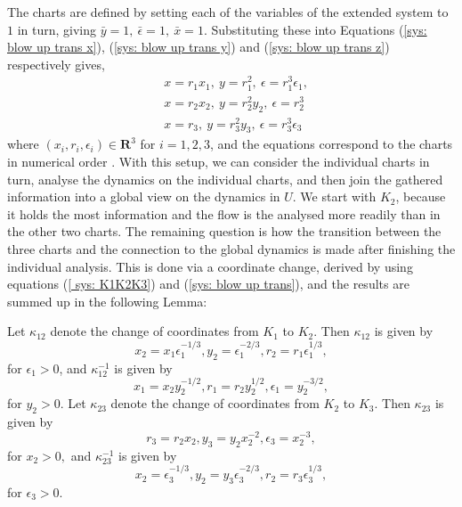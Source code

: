 The charts are defined by setting each of the variables of the extended system to $1$ in turn, giving $ \bar{y}=1, \ \bar{\epsilon}=1, \ \bar{x}=1 $. Substituting these into Equations (\ref{sys: blow up trans x}), (\ref{sys: blow up trans y}) and (\ref{sys: blow up trans z}) respectively gives, 
\begin{subequations} \label{ sys: K1K2K3}
	\begin{align}
	&x=r_1x_1, \ y=r_1^2, \ \epsilon=r_1^3\epsilon_1, \label{sys: K1}\\
	&x=r_2x_2, \ y=r_2^2y_2, \ \epsilon=r_2^3 \label{sys: K2}\\
	&x=r_3, \ y=r_3^2y_3, \ \epsilon=r_3^3\epsilon_3\label{sys:K3}
	\end{align}
\end{subequations}
where $ (x_i,r_i,\epsilon_i)\in\mathbf{R}^3 $ for $ i=1,2,3 $, and the equations correspond to the charts in numerical order \citep{krupa2001}. 
With this setup, we can consider the individual charts in turn, analyse the dynamics on the individual charts, and then join the gathered information into a global view on the dynamics in $U$.
We start with $K_2$,  because it holds the most information and the flow is the analysed more readily than in the other two charts. 
The remaining question is how the transition between the three charts and the connection to the global dynamics is made after finishing the individual analysis.
This is done via a coordinate change, derived by using equations (\ref{ sys: K1K2K3}) and (\ref{sys: blow up trans}), and the results are summed up in the following Lemma:
\begin{lemma} \label{coord. change}
Let $\kappa_{12}$ denote the change of coordinates from $K_1$ to $K_2$. Then $\kappa_{12}$ is given by \\
\begin{equation*}
x_2 = x_1 \epsilon_1^{-1/3},  y_2 = \epsilon_1^{-2/3}, r_2= r_1\epsilon_1^{1/3},
\end{equation*}
for $\epsilon_1 >0$,
and $\kappa_{12}^{-1}$ is given by
\begin{equation*}
x_1 = x_2y_2^{-1/2}, r_1 = r_2 y_2^{1/2}, \epsilon_1= y_2^{-3/2},
\end{equation*}
for $y_2>0$.
Let $\kappa_{23}$ denote the change of coordinates from $K_2$ to $K_3$. Then $\kappa_{23}$ is given by
\begin{equation*}
r_3 = r_2x_2, y_3= y_2x_2^{-2}, \epsilon_3 = x_2^{-3}, \label{eq:kappa23}
\end{equation*}
for $x_2>0,$
and $\kappa_{23}^{-1}$  is given by
\begin{equation*}
x_2 = \epsilon_3^{-1/3}, y_2 = y_3\epsilon_3^{-2/3}, r_2= r_3 \epsilon_3^{1/3},
\end{equation*}
for $\epsilon_3>0$.
\end{lemma}

